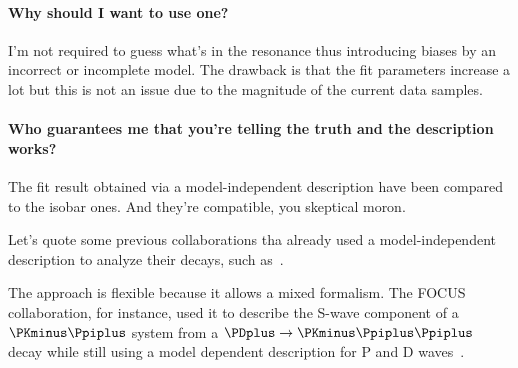     \paragraph{Why should I want to use one?}

    I'm not required to guess what's in the resonance thus introducing biases by an incorrect or incomplete model.
    The drawback is that the fit parameters increase a lot but this is not an issue due to the magnitude of the current data samples.


    \paragraph{Who guarantees me that you're telling the truth and the description works?}

    The fit result obtained via a model-independent description have been compared to the isobar ones.
    And they're compatible, you skeptical moron.


    Let's quote some previous collaborations tha already used a model-independent description to analyze their decays, such as~\cite{PhysRevD.73.032004,Link200914}.


    The approach is flexible because it allows a mixed formalism.
    The {\small FOCUS} collaboration, for instance, used it to describe the S-wave component of a $\PKminus\Ppiplus$ system from a $\PDplus \to \PKminus\Ppiplus\Ppiplus$ decay while still using a model dependent description for P and D waves~\cite{Link200914}.


